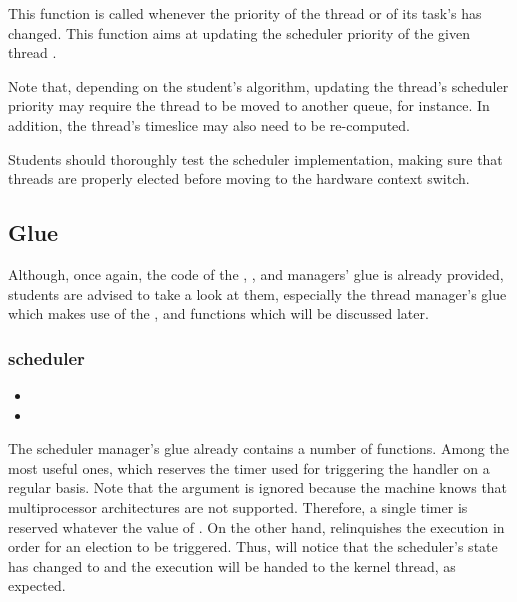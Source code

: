          {
           This function is called whenever the priority of the thread
           or of its task's has changed. This function aims at updating
           the scheduler priority of the given thread .

           \-

           Note that, depending on the student's algorithm, updating the
           thread's scheduler priority may require the thread to be moved
           to another queue, for instance. In addition, the thread's
           timeslice may also need to be re-computed.
         }

Students should thoroughly test the scheduler implementation, making
sure that threads are properly elected before moving to the hardware
context switch.

%
%

\subsection{Glue}

Although, once again, the code of the , , and
 managers' glue is already provided, students are advised
to take a look at them, especially the thread manager's glue which makes
use of the ,  and
 functions which will be discussed later.

\subsubsection*{scheduler}

\begin{itemize}
  \item
  \item
\end{itemize}

The scheduler manager's glue already contains a number of functions. Among
the most useful ones,  which reserves the
timer used for triggering the  handler on
a regular basis. Note that the  argument is ignored because
the machine knows that multiprocessor architectures are not supported.
Therefore, a single timer is reserved whatever the value of .
On the other hand,  relinquishes the execution
in order for an election to be triggered. Thus, 
will notice that the scheduler's state has changed to 
and the execution will be handed to the kernel thread, as expected.

